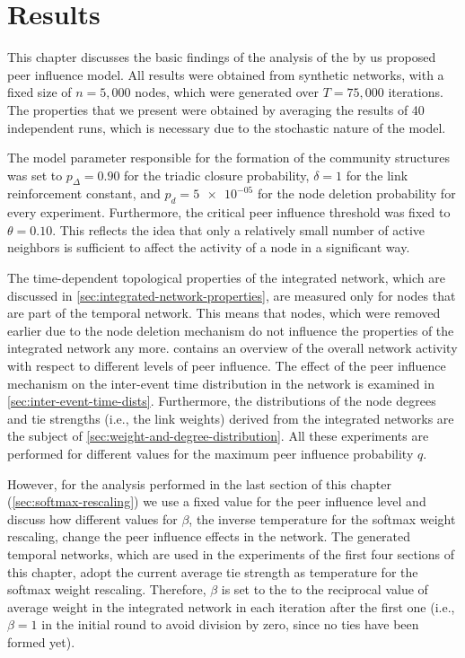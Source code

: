 \chapter{Results}
\label{cha:results}


This chapter discusses the basic findings of the analysis of the by us proposed peer influence model.
All results were obtained from synthetic networks, with a fixed size of \( n = 5,000 \) nodes, which were generated over \( T = 75,000 \) iterations.
The properties that we present were obtained by averaging the results of 40 independent runs, which is necessary due to the stochastic nature of the model.

The model parameter responsible for the formation of the community structures was set to \( p_{\Delta} = 0.90 \) for the triadic closure probability, \( \delta = 1 \) for the link reinforcement constant, and \( p_{d} = \num{5e-05} \) for the node deletion probability for every experiment.
Furthermore, the critical peer influence threshold was fixed to \( \theta = 0.10 \).
This reflects the idea that only a relatively small number of active neighbors is sufficient to affect the activity of a node in a significant way.

The time-dependent topological properties of the integrated network, which are discussed in \cref{sec:integrated-network-properties}, are measured only for nodes that are part of the temporal network.
This means that nodes, which were removed earlier due to the node deletion mechanism do not influence the properties of the integrated network any more.
 contains an overview of the overall network activity with respect to different levels of peer influence.
The effect of the peer influence mechanism on the inter-event time distribution in the network is examined in \cref{sec:inter-event-time-dists}.
Furthermore, the distributions of the node degrees and tie strengths (i.e., the link weights) derived from the integrated networks are the subject of \cref{sec:weight-and-degree-distribution}.
All these experiments are performed for different values for the maximum peer influence probability \( q \).

However, for the analysis performed in the last section of this chapter (\cref{sec:softmax-rescaling}) we use a fixed value for the peer influence level and discuss how different values for \( \beta \), the inverse temperature for the softmax weight rescaling, change the peer influence effects in the network.
The generated temporal networks, which are used in the experiments of the first four sections of this chapter, adopt the current average tie strength as temperature for the softmax weight rescaling.
Therefore, \( \beta \) is set to the to the reciprocal value of average weight in the integrated network in each iteration after the first one (i.e., \( \beta = 1 \) in the initial round to avoid division by zero, since no ties have been formed yet).


